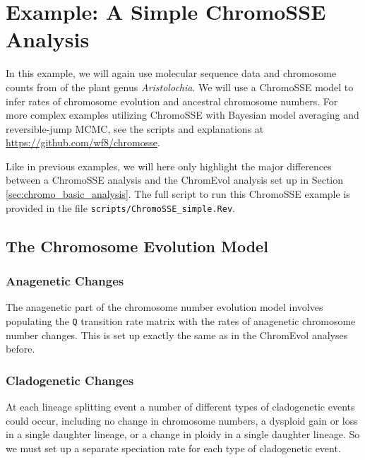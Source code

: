 
\section{Example: A Simple ChromoSSE Analysis}\label{sec:chromosse_analysis}

In this example, we will again use molecular sequence data and chromosome counts from \citet{ohi2006molecular} of the plant genus \textit{Aristolochia}. 
We will use a ChromoSSE model to infer rates of chromosome evolution and ancestral chromosome numbers.
For more complex examples utilizing ChromoSSE with Bayesian model averaging and reversible-jump
MCMC, see the scripts and explanations at \url{https://github.com/wf8/chromosse}.

Like in previous examples, we will here only highlight the major differences between a ChromoSSE
analysis and the ChromEvol analysis set up in Section \ref{sec:chromo_basic_analysis}.
The full script to run this ChromoSSE example is provided in the file \texttt{scripts/ChromoSSE\_simple.Rev}.


\bigskip
\subsection{The Chromosome Evolution Model}


\subsubsection{Anagenetic Changes}

The anagenetic part of the chromosome number evolution model 
involves populating the \texttt{Q} transition rate matrix
with the rates of anagenetic chromosome number changes.
This is set up exactly the same as in the ChromEvol analyses before.

\subsubsection{Cladogenetic Changes}

At each lineage splitting event a number of different
types of cladogenetic events could occur, including
no change in chromosome numbers,
a dysploid gain or loss in a single daughter lineage, or
a change in ploidy in a single daughter lineage.
So we must set up a separate speciation rate for each type of
cladogenetic event.

